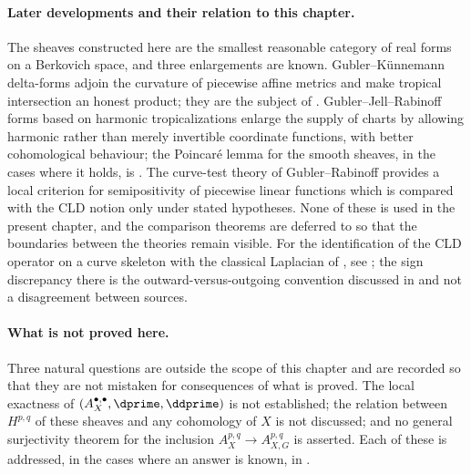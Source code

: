 \paragraph{Later developments and their relation to this chapter.}
The sheaves constructed here are the smallest reasonable category of real
forms on a Berkovich space, and three enlargements are known.
Gubler--K\"unnemann delta-forms \cite{GK17,GK19} adjoin the curvature of
piecewise affine metrics and make tropical intersection an honest product;
they are the subject of .  Gubler--Jell--Rabinoff
forms based on harmonic tropicalizations \cite{GJR26} enlarge the supply of
charts by allowing harmonic rather than merely invertible coordinate
functions, with better cohomological behaviour; the Poincar\'e lemma for the
smooth sheaves, in the cases where it holds, is \cite{Jell16}.  The
curve-test theory of Gubler--Rabinoff \cite{GR25PL,GR25Classical} provides a
local criterion for semipositivity of piecewise linear functions which is
compared with the CLD notion only under stated hypotheses.  None of these is
used in the present chapter, and the comparison theorems are deferred to
 so that the boundaries between the theories remain
visible.  For the identification of the CLD operator on a curve skeleton with
the classical Laplacian of , see
\cite{Wanner19}; the sign discrepancy there is the outward-versus-outgoing
convention discussed in  and not a
disagreement between sources.

\paragraph{What is not proved here.}
Three natural questions are outside the scope of this chapter and are
recorded so that they are not mistaken for consequences of what is proved.
The local exactness of $(A^{\bullet,\bullet}_X,\dprime,\ddprime)$ is not
established; the relation between $H^{p,q}$ of these sheaves and any
cohomology of $X$ is not discussed; and no general surjectivity theorem for
the inclusion $A^{p,q}_X\to A^{p,q}_{X,G}$ is asserted.  Each of these is
addressed, in the cases where an answer is known, in
.
